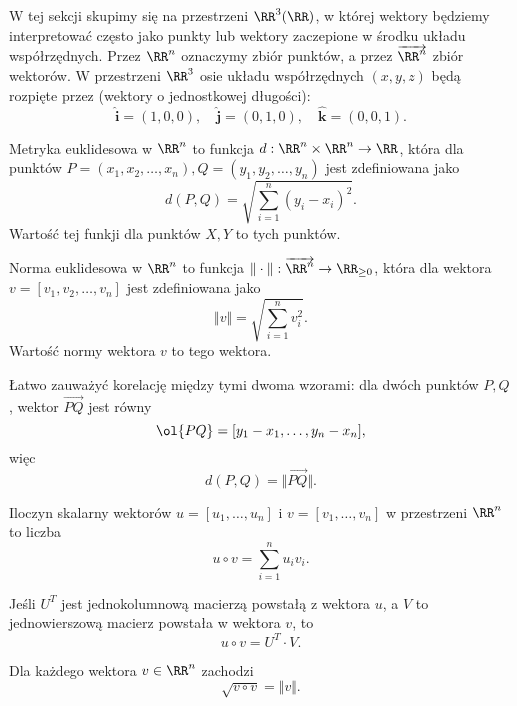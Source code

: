 W tej sekcji skupimy się na przestrzeni $\RR^3(\RR)$, w której wektory będziemy interpretować często jako punkty lub wektory zaczepione w środku układu współrzędnych. Przez $\RR^n$ oznaczymy zbiór punktów, a przez $\overrightarrow{\RR^n}$ zbiór wektorów. W przestrzeni $\RR^3$ osie  układu współrzędnych $(x, y, z)$ będą rozpięte przez  (wektory o jednostkowej długości):
\[ \mathbf{\hat{i}} = (1, 0, 0), \quad \mathbf{\hat{j}} = (0, 1, 0), \quad \mathbf{\hat{k}} = (0, 0, 1). \]

\begin{definition}
    \label{d:Euclidean metric}
    Metryka euklidesowa w $\RR^n$ to funkcja $d : \RR^n \times \RR^n \to \RR$, która dla punktów $P = (x_1, x_2, \ldots, x_n), Q = (y_1, y_2, \ldots, y_n)$ jest zdefiniowana jako
    \[ d(P, Q) = \sqrt{\sum_{i = 1}^n (y_i - x_i)^2}. \]
    Wartość tej funkji dla punktów $X, Y$ to  tych punktów.
\end{definition}

\begin{definition}
    Norma euklidesowa w $\RR^n$ to funkcja $\Vert\cdot\Vert : \overrightarrow{\RR^n} \to \RR_{\geq 0}$, która dla wektora $v = [v_1, v_2, \ldots, v_n]$ jest zdefiniowana jako
    \[ \Vert v\Vert = \sqrt{\sum_{i=1}^n v_i^2}. \]
    Wartość normy wektora $v$ to  tego wektora.
\end{definition}

Łatwo zauważyć korelację między tymi dwoma wzorami: dla dwóch punktów $P, Q$, wektor $\overrightarrow{PQ}$ jest równy
\[ \ol{PQ} = [y_1 - x_1, \ldots, y_n - x_n], \]
więc
\[ d(P, Q) = \Vert\overrightarrow{PQ}\Vert. \]

\begin{definition}
    Iloczyn skalarny wektorów $u = [u_1, \ldots, u_n]$ i $v = [v_1, \ldots, v_n]$ w przestrzeni $\RR^n$ to liczba
    \[ u \circ v = \sum_{i=1}^n u_iv_i. \]
\end{definition}

\begin{fact}
    Jeśli $U^T$ jest jednokolumnową macierzą powstałą z wektora $u$, a $V$ to jednowierszową macierz powstała w wektora $v$, to
    \[ u \circ v = U^T \cdot V. \]
\end{fact}

\begin{fact}
    Dla każdego wektora $v \in \RR^n$ zachodzi
    \[ \sqrt{v \circ v} = \Vert v \Vert. \]
\end{fact}

